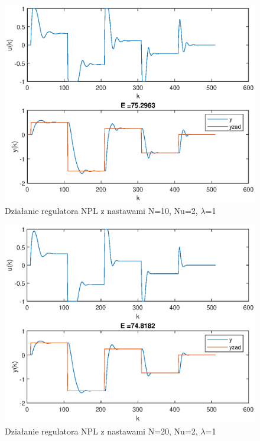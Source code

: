 		\begin{figure}[h!]
			\centering
			\includegraphics[width=\linewidth]{img/strojenieNPL_N_10_Nu_2_lam_1.eps}
			\caption{Działanie regulatora NPL z nastawami N=10, Nu=2, $\lambda$=1}
			\label{fig:NPL0}
		\end{figure}
		
		\begin{figure}[h!]
			\centering
			\includegraphics[width=\linewidth]{img/NPLN20.eps}
			\caption{Działanie regulatora NPL z nastawami N=20, Nu=2, $\lambda$=1}
			\label{fig:NPL1}
		\end{figure}
		

